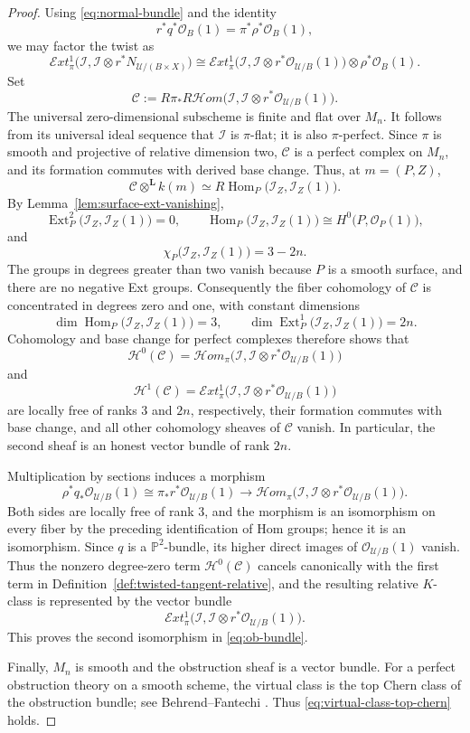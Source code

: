 \documentclass[12pt]{amsart}
\numberwithin{equation}{section}
\newcommand{\PP}{\mathbb{P}}
\newcommand{\OO}{\mathcal{O}}
\newcommand{\I}{\mathcal{I}}
\newcommand{\Ext}{\operatorname{Ext}}
\newcommand{\Hom}{\operatorname{Hom}}
\theoremstyle{plain}
\theoremstyle{definition}
\theoremstyle{remark}
\begin{document}
\begin{proof}
Using \eqref{eq:normal-bundle} and the identity
\[
r^*q^*\OO_B(1)=\pi^*\rho^*\OO_B(1),
\]
we may factor the twist as
\[
\mathcal Ext^1_{\pi}\bigl(\mathcal I,\mathcal I\otimes r^*N_{\mathcal U/(B\times X)}\bigr)
\cong
\mathcal Ext^1_{\pi}\bigl(\mathcal I,\mathcal I\otimes r^*\OO_{\mathcal U/B}(1)\bigr)\otimes \rho^*\OO_B(1).
\]
Set
\[
\mathcal C:=
R\pi_*R\mathcal Hom\bigl(\mathcal I,
\mathcal I\otimes r^*\OO_{\mathcal U/B}(1)\bigr).
\]
The universal zero-dimensional subscheme is finite and flat over $M_n$.
It follows from its universal ideal sequence that $\mathcal I$ is $\pi$-flat; it is also $\pi$-perfect.
Since $\pi$ is smooth and projective of relative dimension two, $\mathcal C$ is a perfect complex on $M_n$, and its formation commutes with derived base change.
Thus, at $m=(P,Z)$,
\[
\mathcal C\otimes^{\mathbf L}k(m)
\simeq
R\Hom_P\bigl(\I_Z,\I_Z(1)\bigr).
\]
By Lemma~\ref{lem:surface-ext-vanishing},
\[
\Ext^2_P\bigl(\I_Z,\I_Z(1)\bigr)=0,
\qquad
\Hom_P\bigl(\I_Z,\I_Z(1)\bigr)
\cong H^0\bigl(P,\OO_P(1)\bigr),
\]
and
\[
\chi_P\bigl(\I_Z,\I_Z(1)\bigr)=3-2n.
\]
The groups in degrees greater than two vanish because $P$ is a smooth surface, and there are no negative Ext groups.
Consequently the fiber cohomology of $\mathcal C$ is concentrated in degrees zero and one, with constant dimensions
\[
\dim\Hom_P\bigl(\I_Z,\I_Z(1)\bigr)=3,
\qquad
\dim\Ext^1_P\bigl(\I_Z,\I_Z(1)\bigr)=2n.
\]
Cohomology and base change for perfect complexes therefore shows that
\[
\mathcal H^0(\mathcal C)
=\mathcal Hom_{\pi}\bigl(\mathcal I,
\mathcal I\otimes r^*\OO_{\mathcal U/B}(1)\bigr)
\]
and
\[
\mathcal H^1(\mathcal C)
=\mathcal Ext^1_{\pi}\bigl(\mathcal I,
\mathcal I\otimes r^*\OO_{\mathcal U/B}(1)\bigr)
\]
are locally free of ranks $3$ and $2n$, respectively, their formation commutes with base change, and all other cohomology sheaves of $\mathcal C$ vanish.
In particular, the second sheaf is an honest vector bundle of rank $2n$.

Multiplication by sections induces a morphism
\[
\rho^*q_*\OO_{\mathcal U/B}(1)
\cong \pi_*r^*\OO_{\mathcal U/B}(1)
\longrightarrow
\mathcal Hom_{\pi}\bigl(\mathcal I,
\mathcal I\otimes r^*\OO_{\mathcal U/B}(1)\bigr).
\]
Both sides are locally free of rank $3$, and the morphism is an isomorphism on every fiber by the preceding identification of Hom groups; hence it is an isomorphism.
Since $q$ is a $\PP^2$-bundle, its higher direct images of $\OO_{\mathcal U/B}(1)$ vanish.
Thus the nonzero degree-zero term $\mathcal H^0(\mathcal C)$ cancels canonically with the first term in Definition~\ref{def:twisted-tangent-relative}, and the resulting relative $K$-class is represented by the vector bundle
\[
\mathcal Ext^1_{\pi}\bigl(\mathcal I,\mathcal I\otimes r^*\OO_{\mathcal U/B}(1)\bigr).
\]
This proves the second isomorphism in \eqref{eq:ob-bundle}.

Finally, $M_n$ is smooth and the obstruction sheaf is a vector bundle.
For a perfect obstruction theory on a smooth scheme, the virtual class is the top Chern class of the obstruction bundle; see Behrend--Fantechi \cite{BF}.
Thus \eqref{eq:virtual-class-top-chern} holds.
\end{proof}
\end{document}
